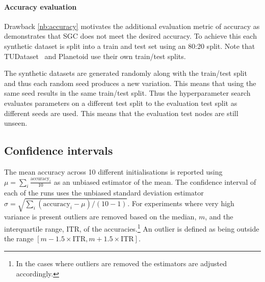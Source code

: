 
\paragraph{Accuracy evaluation}
Drawback \ref{nb:accuracy} motivates the additional evaluation metric of accuracy as  demonstrates that SGC does not meet the desired accuracy.
To achieve this each synthetic dataset is split into a train and test set using an 80:20 split.
Note that TUDataset~\cite{Morris+2020} and Planetoid\cite{kipf2016semi} use their own train/test splits.

The synthetic datasets are generated randomly along with the train/test split and thus each random seed produces a new variation.
This means that using the same seed results in the same train/test split.
Thus the hyperparameter search evaluates parameters on a different test split to the evaluation test split as different seeds are used.
This means that the evaluation test nodes are still unseen.

\subsection{Confidence intervals}
\label{sec:reporting}
The mean accuracy across 10 different initialisations is reported using $\mu = \sum_i\frac{\text{accuracy}_i}{10}$ as an unbiased estimator of the mean.
The confidence interval of each of the runs uses the unbiased standard deviation estimator $\sigma = \sqrt{\sum_i(\text{accuracy}_i - \mu)/(10 - 1)}$.
For experiments where very high variance is present outliers are removed based on the median, $m$, and the interquartile range, $\text{ITR}$, of the accuracies.\footnote{In the cases where outliers are removed the estimators are adjusted accordingly.}
An outlier is defined as being outside the range $[m - 1.5 \times \text{ITR}, m + 1.5 \times \text{ITR}]$.


